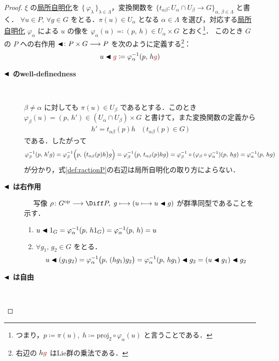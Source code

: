 \documentclass[TQFT_main]{subfiles}
\begin{document}
\begin{proof}
    $\xi$ の\hyperref[def.fiber-1]{局所自明化}を $\{\, \varphi_\lambda \,\}_{\lambda \in \Lambda}$，変換関数を $\{t_{\alpha\beta} \colon U_\alpha \cap U_\beta \to G\}_{\alpha,\, \beta \in \Lambda}$ と書く．
	$\forall u \in P,\, \forall g \in G$ をとる．$\pi(u) \in U_\alpha$ となる $\alpha \in \Lambda$ を選び，対応する\hyperref[def.fiber-1]{局所自明化} $\varphi_\alpha$ による $u$ の像を $\varphi_\alpha (u) \eqqcolon (p,\, h) \in U_\alpha \times G$ とおく\footnote{つまり，$p \coloneqq \pi(u),\; h \coloneqq \mathrm{proj}_2 \circ \varphi_\alpha (u)$ と言うことである．}．
    このとき $G$ の $P$ への右作用 $\blacktriangleleft \colon P \times G \longrightarrow P$ を次のように定義する\footnote{右辺の $h \textcolor{red}{g}$ はLie群の乗法である．}：
	\begin{align}
		\label{def:ractionP}
		u \blacktriangleleft \textcolor{red}{g} \coloneqq \varphi_\alpha^{-1}(p,\, h \textcolor{red}{g})
	\end{align}
	
	\begin{description}
		\item[\textbf{$\blacktriangleleft$ のwell-definedness}]　

			$\beta \neq \alpha$ に対しても $\pi(u) \in U_\beta$ であるとする．このとき $\varphi_\beta(u) = (p,\, h') \in (U_\alpha \cap U_\beta) \times G$ と書けて，また変換関数の定義から
			\begin{align}
				h' = t_{\alpha\beta}(p) h \quad \bigl(\, t_{\alpha\beta}(p) \in G\, \bigr)
			\end{align}
			である．したがって
			\begin{align}
				\varphi_\beta^{-1}(p,\, h'g) = \varphi_\beta^{-1}\Bigl(p,\, \bigl(t_{\alpha\beta}(p) h\bigr)g\Bigr) = \varphi_\beta^{-1}\bigl(p,\, t_{\alpha\beta}(p)  hg \bigr) = \varphi_\beta^{-1} \circ (\varphi_\beta \circ \varphi_\alpha^{-1})(p,\, h g) = \varphi_\alpha^{-1}(p,\, h g)
			\end{align}
			が分かり，式\eqref{def:ractionP}の右辺は局所自明化の取り方によらない．
		\item[\textbf{$\blacktriangleleft$ は右作用}]　
			写像 $\rho \colon G^{\text{op}} \lto \Diff P,\; g \lmto (u \lmto u \btl g)$ が群準同型であることを示す．
            \begin{enumerate}
				\item $u \blacktriangleleft 1_G = \varphi_\alpha^{-1}(p,\, h1_G) = \varphi_\alpha^{-1}(p,\, h) = u$
				\item $\forall g_1,\, g_2 \in G$ をとる．
				\begin{align}
					u \blacktriangleleft (g_1g_2) = \varphi_\alpha^{-1}\bigl(p,\, (hg_1)g_2 \bigr) = \varphi_\alpha^{-1}(p,\, hg_1) \blacktriangleleft g_2 = (u \blacktriangleleft g_1) \blacktriangleleft g_2
				\end{align} 
			\end{enumerate}
		\item[\textbf{$\blacktriangleleft$ は自由}]　
		

\end{description}
\end{proof}
\end{document}
